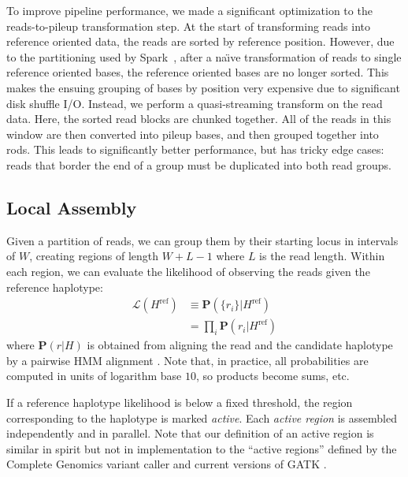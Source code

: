 \documentclass{acm_proc_article-sp}
\begin{document}
To improve pipeline performance, we made a significant optimization to the reads-to-pileup transformation step. At the start of
transforming reads into reference oriented data, the reads are sorted by reference position. However, due to the partitioning
used by Spark~\cite{zaharia10}, after a na\"{\i}ve transformation of reads to single reference oriented bases, the reference
oriented bases are no longer sorted. This makes the ensuing grouping of bases by position very expensive due to significant disk
shuffle I/O. Instead, we perform a quasi-streaming transform on the read data. Here, the sorted read blocks are chunked together.
All of the reads in this window are then converted into pileup bases, and then grouped together into rods. This leads to significantly
better performance, but has tricky edge cases: reads that border the end of a group must be duplicated into both read groups.

\subsection{Local Assembly}
\label{sec:local-assembly}


Given a partition of reads, we can group them by their starting locus in
intervals of $W$, creating regions of length $W+L-1$ where $L$ is the
read length.
Within each region, we can evaluate the likelihood of observing the reads
given the reference haplotype:
\begin{align}
  \mathcal L(H^\text{ref})
  &\equiv\mathbf P(\{r_i\}|H^\text{ref}) \\ \nonumber
  &=\prod_i\mathbf P(r_i|H^\text{ref})
\end{align}
where $\mathbf P(r|H)$ is obtained from aligning the read and the
candidate haplotype by a pairwise HMM alignment \cite{durbin98}.
Note that, in practice, all probabilities are computed in units of logarithm
base $10$, so products become sums, etc.

If a reference haplotype likelihood is below a fixed threshold,
the region corresponding to the haplotype is marked \emph{active}.
Each \emph{active region} is assembled independently and in parallel.
Note that our definition of an active region is similar in spirit but not in
implementation to the ``active regions'' defined by the Complete Genomics
variant caller \cite{carnevali12} and current versions of GATK \cite{depristo11}.
\end{document}
